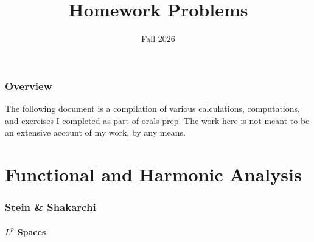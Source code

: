 \documentclass{article}
\title{Homework Problems}
\author{\me}
\date{Fall 2026}
\begin{document}
	\maketitle
	\fullline 
	\tableofcontents
	\xappto\thefootnote{\relax}
	\halfline 
	\newpage 
	\setlength{\parskip}{0.55em}
	
	\section{Overview}
	
	The following document is a compilation of various calculations, computations, and exercises I completed as part of orals prep. The work here is not meant to be an extensive account of my work, by any means. 
	
\newpage 
\part{Functional and Harmonic Analysis} 
\section{Stein \& Shakarchi} 
\subsection{\texorpdfstring{$L^p$}{Lp} Spaces}
\end{document}
